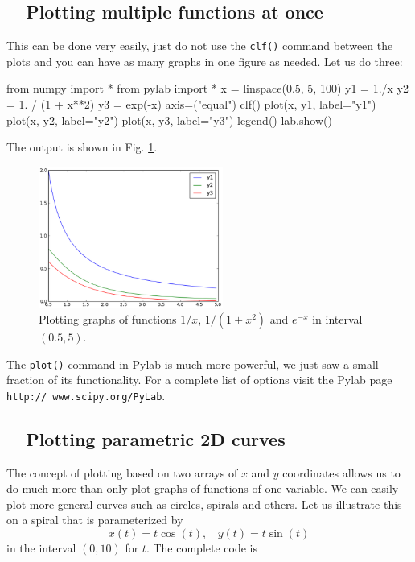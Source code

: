 \subsection{\ \ Plotting multiple functions at once}

This can be done very easily, just do not use the {\tt clf()}
command between the plots and you can have as many graphs 
in one figure as needed. Let us do three:

\begin{bluecode}
from numpy import *
from pylab import *
x = linspace(0.5, 5, 100)
y1 = 1./x
y2 = 1. / (1 + x**2)
y3 = exp(-x)
axis=("equal")
clf()
plot(x, y1, label="y1")
plot(x, y2, label="y2")
plot(x, y3, label="y3")
legend()
lab.show()
\end{bluecode}
\noindent
The output is shown in Fig. \ref{fig:plot7}.
\newpage

\begin{figure}[!ht]
\begin{center}
\includegraphics[width=0.54\textwidth]{imgp/plot7.png}
\end{center}
\vspace{-4mm}
\caption{Plotting graphs of functions $1/x$, $1 / (1 + x^2)$ and $e^{-x}$ in interval $(0.5, 5)$.}
\label{fig:plot7}
\vspace{-2mm}
\end{figure}
\noindent
The {\tt plot()} command in Pylab is much more powerful, we just saw a small 
fraction of its functionality. For a complete list of options 
visit the Pylab page {\tt http:// www.scipy.org/PyLab}.

\subsection{\ \ Plotting parametric 2D curves}\label{subsec:planarcurves}

The concept of plotting based on two arrays of $x$ and $y$ coordinates
allows us to do much more than only plot graphs of functions of one variable.
We can easily plot more general curves such as circles, spirals and others.
Let us illustrate this on a spiral that is parameterized 
by 
$$
x(t) = t \cos(t), \ \ \ \ 
y(t) = t \sin(t)
$$ 
in the interval $(0, 10)$ for $t$. The complete code is

